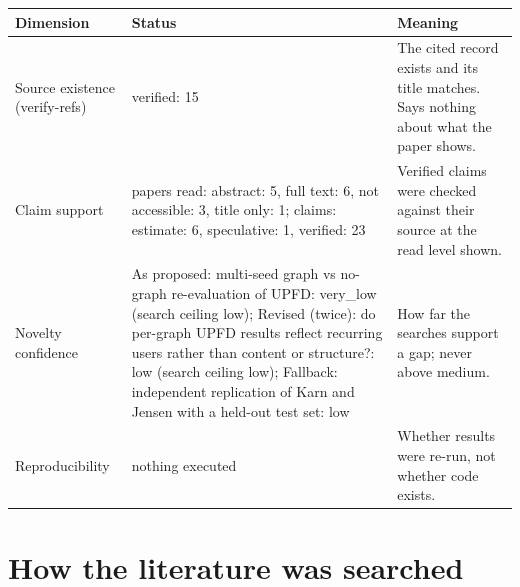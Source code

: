 \documentclass[11pt,a4paper]{article}
\begin{document}
{\small
\begin{longtable}{>{\raggedright\arraybackslash}p{}>{\raggedright\arraybackslash}p{}>{\raggedright\arraybackslash}p{}}
\toprule
\textbf{Dimension} & \textbf{Status} & \textbf{Meaning} \\
\midrule
\endhead
Source existence (verify-refs) & verified: 15 & The cited record exists and its title matches. Says nothing about what the paper shows. \\
Claim support & papers read: abstract: 5, full text: 6, not accessible: 3, title only: 1; claims: estimate: 6, speculative: 1, verified: 23 & Verified claims were checked against their source at the read level shown. \\
Novelty confidence & As proposed: multi-seed graph vs no-graph re-evaluation of UPFD: very\_low (search ceiling low); Revised (twice): do per-graph UPFD results reflect recurring users rather than content or structure?: low (search ceiling low); Fallback: independent replication of Karn and Jensen with a held-out test set: low & How far the searches support a gap; never above medium. \\
Reproducibility & nothing executed & Whether results were re-run, not whether code exists. \\
\bottomrule
\end{longtable}
}

\section{How the literature was searched}
\end{document}
